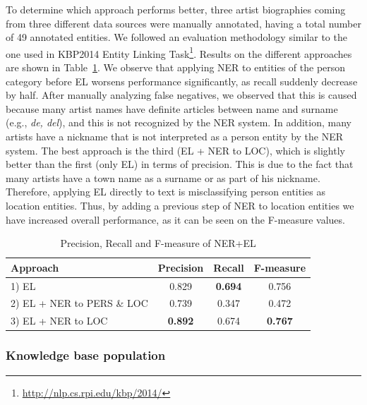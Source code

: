 To determine which approach performs better, three artist biographies coming from three different data sources were manually annotated, having a total number of 49 annotated entities. We followed an evaluation methodology similar to the one used in KBP2014 Entity Linking Task\footnote{\url{http://nlp.cs.rpi.edu/kbp/2014/}}. Results on the different approaches are shown in Table~\ref{tbl:musicology:res1}. We observe that applying NER to entities of the person category before EL worsens performance significantly, as recall suddenly decrease by half. After manually analyzing false negatives, we observed that this is caused because many artist names have definite articles between name and surname (e.g., \textit{de, del}), and this is not recognized by the NER system. In addition, many artists have a nickname that is not interpreted as a person entity by the NER system. The best approach is the third (EL + NER to LOC), which is slightly better than the first (only EL) in terms of precision. This is due to the fact that many artists have a town name as a surname or as part of his nickname. Therefore, applying EL directly to text is misclassifying person entities as location entities. Thus, by adding a previous step of NER to location entities we have increased overall performance, as it can be seen on the F-measure values.

\begin{table}
	\centering
	  \begin{tabular}{ | l | c | c | c | }
    \hline
    Approach & Precision & Recall & F-measure \\ \hline
    \hline
    1) EL & 0.829 & \textbf{0.694} & 0.756 \\ 
    2) EL + NER to PERS \& LOC & 0.739 & 0.347 & 0.472 \\
    3) EL + NER to LOC & \textbf{0.892} & 0.674 & \textbf{0.767} \\
    \hline
  \end{tabular}
	\caption{Precision, Recall and F-measure of NER+EL}
	
	\label{tbl:musicology:res1}
\end{table}

\subsubsection{Knowledge base population}\label{sec:musicology:ie}

